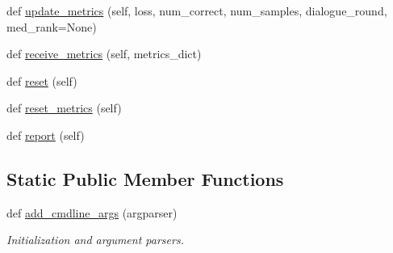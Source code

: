\begin{DoxyCompactItemize}
\item 
def \hyperlink{classprojects_1_1image__chat_1_1transresnet__multimodal_1_1transresnet__multimodal_1_1TransresnetMultimodalAgent_a57fb284e1f2308c4524c72af053c9397}{update\+\_\+metrics} (self, loss, num\+\_\+correct, num\+\_\+samples, dialogue\+\_\+round, med\+\_\+rank=None)
\item 
def \hyperlink{classprojects_1_1image__chat_1_1transresnet__multimodal_1_1transresnet__multimodal_1_1TransresnetMultimodalAgent_a912122759d9ade4a11ddd1a5b5961069}{receive\+\_\+metrics} (self, metrics\+\_\+dict)
\item 
def \hyperlink{classprojects_1_1image__chat_1_1transresnet__multimodal_1_1transresnet__multimodal_1_1TransresnetMultimodalAgent_a69f4b7af1d416cb67b9a10159a297e01}{reset} (self)
\item 
def \hyperlink{classprojects_1_1image__chat_1_1transresnet__multimodal_1_1transresnet__multimodal_1_1TransresnetMultimodalAgent_a3637844305cec03781959fedcbf11457}{reset\+\_\+metrics} (self)
\item 
def \hyperlink{classprojects_1_1image__chat_1_1transresnet__multimodal_1_1transresnet__multimodal_1_1TransresnetMultimodalAgent_a3fdcebd154e706f6d0ad6b2dd9fbdbbe}{report} (self)
\end{DoxyCompactItemize}
\subsection*{Static Public Member Functions}
\begin{DoxyCompactItemize}
\item 
def \hyperlink{classprojects_1_1image__chat_1_1transresnet__multimodal_1_1transresnet__multimodal_1_1TransresnetMultimodalAgent_a79a0a51097fb1cb89751a17879b519e1}{add\+\_\+cmdline\+\_\+args} (argparser)
\begin{DoxyCompactList}\small\item\em Initialization and argument parsers. \end{DoxyCompactList}\end{DoxyCompactItemize}
